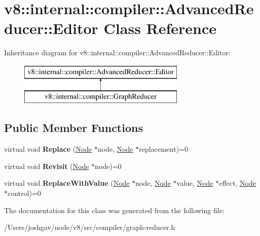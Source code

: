 \hypertarget{classv8_1_1internal_1_1compiler_1_1_advanced_reducer_1_1_editor}{}\section{v8\+:\+:internal\+:\+:compiler\+:\+:Advanced\+Reducer\+:\+:Editor Class Reference}
\label{classv8_1_1internal_1_1compiler_1_1_advanced_reducer_1_1_editor}
Inheritance diagram for v8\+:\+:internal\+:\+:compiler\+:\+:Advanced\+Reducer\+:\+:Editor\+:\begin{figure}[H]
\begin{center}
\leavevmode
\includegraphics[height=2.000000cm]{classv8_1_1internal_1_1compiler_1_1_advanced_reducer_1_1_editor}
\end{center}
\end{figure}
\subsection*{Public Member Functions}
\begin{DoxyCompactItemize}
\item 
virtual void {\bfseries Replace} (\hyperlink{classv8_1_1internal_1_1compiler_1_1_node}{Node} $\ast$node, \hyperlink{classv8_1_1internal_1_1compiler_1_1_node}{Node} $\ast$replacement)=0\hypertarget{classv8_1_1internal_1_1compiler_1_1_advanced_reducer_1_1_editor_abc36cb3b1180e6f1d7503f23e3ce6599}{}\label{classv8_1_1internal_1_1compiler_1_1_advanced_reducer_1_1_editor_abc36cb3b1180e6f1d7503f23e3ce6599}

\item 
virtual void {\bfseries Revisit} (\hyperlink{classv8_1_1internal_1_1compiler_1_1_node}{Node} $\ast$node)=0\hypertarget{classv8_1_1internal_1_1compiler_1_1_advanced_reducer_1_1_editor_af5bf4b059b3da8aef10460e84e9daede}{}\label{classv8_1_1internal_1_1compiler_1_1_advanced_reducer_1_1_editor_af5bf4b059b3da8aef10460e84e9daede}

\item 
virtual void {\bfseries Replace\+With\+Value} (\hyperlink{classv8_1_1internal_1_1compiler_1_1_node}{Node} $\ast$node, \hyperlink{classv8_1_1internal_1_1compiler_1_1_node}{Node} $\ast$value, \hyperlink{classv8_1_1internal_1_1compiler_1_1_node}{Node} $\ast$effect, \hyperlink{classv8_1_1internal_1_1compiler_1_1_node}{Node} $\ast$control)=0\hypertarget{classv8_1_1internal_1_1compiler_1_1_advanced_reducer_1_1_editor_a9884e9cb51038a662e9dfc1da53af593}{}\label{classv8_1_1internal_1_1compiler_1_1_advanced_reducer_1_1_editor_a9884e9cb51038a662e9dfc1da53af593}

\end{DoxyCompactItemize}


The documentation for this class was generated from the following file\+:\begin{DoxyCompactItemize}
\item 
/\+Users/joshgav/node/v8/src/compiler/graph-\/reducer.\+h\end{DoxyCompactItemize}
